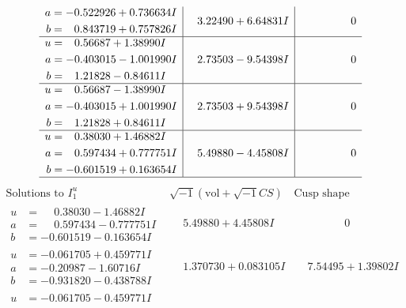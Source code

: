 \documentclass[1p]{elsarticle_modified}
\theoremstyle{definition}
\newcommand{\I}{\sqrt{-1}}
\begin{document}
$$\begin{array}{c|c|c}
\begin{aligned}
a &= -0.522926 + 0.736634 I \\
b &= \phantom{-}0.843719 + 0.757826 I\end{aligned}
 & \phantom{-}3.22490 + 6.64831 I & \phantom{-0.000000 } 0 \\ \hline\begin{aligned}
u &= \phantom{-}0.56687 + 1.38990 I \\
a &= -0.403015 - 1.001990 I \\
b &= \phantom{-}1.21828 - 0.84611 I\end{aligned}
 & \phantom{-}2.73503 - 9.54398 I & \phantom{-0.000000 } 0 \\ \hline\begin{aligned}
u &= \phantom{-}0.56687 - 1.38990 I \\
a &= -0.403015 + 1.001990 I \\
b &= \phantom{-}1.21828 + 0.84611 I\end{aligned}
 & \phantom{-}2.73503 + 9.54398 I & \phantom{-0.000000 } 0 \\ \hline\begin{aligned}
u &= \phantom{-}0.38030 + 1.46882 I \\
a &= \phantom{-}0.597434 + 0.777751 I \\
b &= -0.601519 + 0.163654 I\end{aligned}
 & \phantom{-}5.49880 - 4.45808 I & \phantom{-0.000000 } 0\\
 \hline 
 \end{array}$$\newpage$$\begin{array}{c|c|c}  
\text{Solutions to }I^u_{1}& \I (\text{vol} + \sqrt{-1}CS) & \text{Cusp shape}\\
 \hline 
\begin{aligned}
u &= \phantom{-}0.38030 - 1.46882 I \\
a &= \phantom{-}0.597434 - 0.777751 I \\
b &= -0.601519 - 0.163654 I\end{aligned}
 & \phantom{-}5.49880 + 4.45808 I & \phantom{-0.000000 } 0 \\ \hline\begin{aligned}
u &= -0.061705 + 0.459771 I \\
a &= -0.20987 - 1.60716 I \\
b &= -0.931820 - 0.438788 I\end{aligned}
 & \phantom{-}1.370730 + 0.083105 I & \phantom{-}7.54495 + 1.39802 I \\ \hline\begin{aligned}
u &= -0.061705 - 0.459771 I \\

\end{aligned}
\end{array}$$
\end{document}
